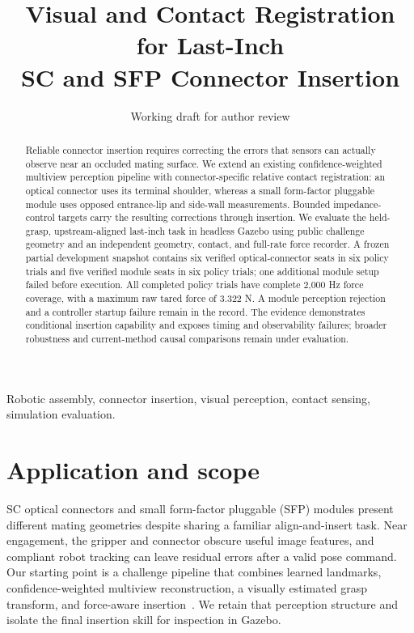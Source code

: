 \documentclass[letterpaper,10pt,conference]{ieeeconf}
\title{Visual and Contact Registration for Last-Inch\\SC and SFP Connector Insertion}
\author{Working draft for author review}
\begin{document}
\maketitle
\thispagestyle{plain}\pagestyle{plain}

\begin{abstract}
Reliable connector insertion requires correcting the errors that sensors can
actually observe near an occluded mating surface. We extend an existing
confidence-weighted multiview perception pipeline with connector-specific
relative contact registration: an optical connector uses its terminal shoulder,
whereas a small form-factor pluggable module uses opposed entrance-lip and
side-wall measurements. Bounded impedance-control targets carry the resulting
corrections through insertion. We evaluate the held-grasp, upstream-aligned
last-inch task in headless Gazebo using public challenge geometry and an
independent geometry, contact, and full-rate force recorder. A frozen partial
development snapshot contains six verified optical-connector seats in six
policy trials and five verified module seats in six policy trials; one
additional module setup failed before execution. All completed policy trials
have complete 2,000 Hz force coverage, with a maximum raw tared force of
3.322 N. A module perception rejection and a controller
startup failure remain in the record. The evidence demonstrates conditional
insertion capability and exposes timing and observability failures; broader
robustness and current-method causal comparisons remain under evaluation.
\end{abstract}

\begin{keywords}
Robotic assembly, connector insertion, visual perception, contact sensing,
simulation evaluation.
\end{keywords}

\section{Application and scope}
SC optical connectors and small form-factor pluggable (SFP) modules present
different mating geometries despite sharing a familiar align-and-insert task.
Near engagement, the gripper and connector obscure useful image features, and
compliant robot tracking can leave residual errors after a valid pose command.
Our starting point is a challenge pipeline that combines learned landmarks,
confidence-weighted multiview reconstruction, a visually estimated grasp
transform, and force-aware insertion~\cite{team}. We retain that perception
structure and isolate the final insertion skill for inspection in Gazebo.
\end{document}
